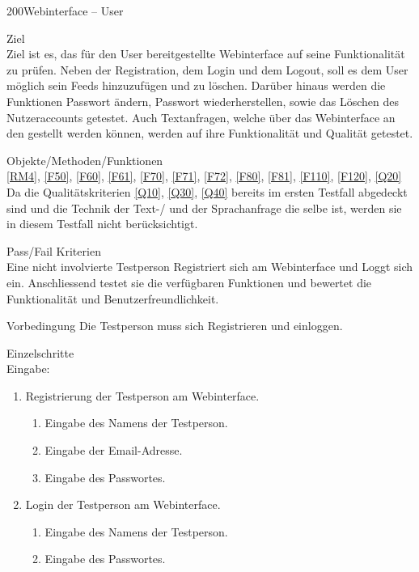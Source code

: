 \begin{testcase}{200}{Webinterface -- User}
\item[Ziel]~\\
Ziel ist es, das für den User bereitgestellte Webinterface auf seine Funktionalität zu prüfen.
Neben der Registration, dem Login und dem Logout, soll es dem User möglich sein Feeds hinzuzufügen und zu löschen. Darüber hinaus werden die Funktionen Passwort ändern, Passwort wiederherstellen, sowie das Löschen des Nutzeraccounts getestet.
Auch Textanfragen, welche über das Webinterface an den \NewsGenie gestellt werden können, werden auf ihre Funktionalität und Qualität getestet.

\item[Objekte/Methoden/Funktionen]~\\
\ref{RM4}, \ref{F50}, \ref{F60}, \ref{F61}, \ref{F70}, \ref{F71}, \ref{F72}, 
\ref{F80}, \ref{F81}, \ref{F110}, \ref{F120}, \ref{Q20} \\
Da die Qualitätskriterien \ref{Q10}, \ref{Q30}, \ref{Q40} bereits im ersten Testfall abgedeckt sind und die 
Technik der Text-/ und der Sprachanfrage die selbe ist, werden sie in diesem Testfall nicht berücksichtigt.
\item[Pass/Fail Kriterien]~\\
Eine nicht involvierte Testperson Registriert sich am Webinterface und Loggt sich ein. Anschliessend testet sie die verfügbaren Funktionen und bewertet die Funktionalität und Benutzerfreundlichkeit.
\item[Vorbedingung]
Die Testperson muss sich Registrieren und einloggen.
\item[Einzelschritte]~\\
Eingabe:
\begin{enumerate}
  \item Registrierung der Testperson am Webinterface.
  \begin{enumerate}
    \item Eingabe des Namens der Testperson.
    \item Eingabe der Email-Adresse.
    \item Eingabe des Passwortes.
  \end{enumerate}
  \item \label{Login} Login der Testperson am Webinterface.
  \begin{enumerate}
    \item Eingabe des Namens der Testperson.
    \item Eingabe des Passwortes.
  \end{enumerate}  

\end{enumerate}
\end{testcase}
